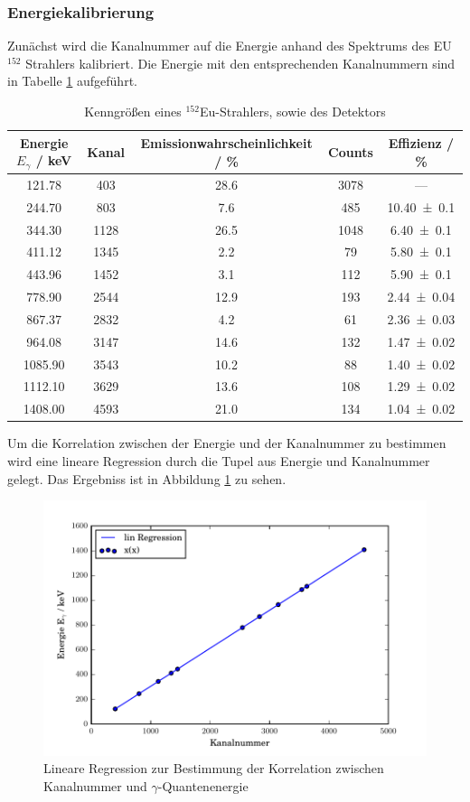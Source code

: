 \subsubsection{Energiekalibrierung}
Zunächst wird die Kanalnummer auf die Energie anhand des Spektrums des EU$^{152}$ Strahlers kalibriert. Die Energie mit den entsprechenden Kanalnummern sind in Tabelle \ref{tab:CsSpekt} aufgeführt.
\begin{table}
  \centering
  \caption{Kenngrößen eines $^{152}$Eu-Strahlers, sowie des Detektors}
  \begin{tabular}{c | c c c c}
    \toprule
    Energie $E_{\gamma}$ / keV& Kanal & Emissionwahrscheinlichkeit / \% & Counts & Effizienz / \% \\	
    \hline
    121.78	& 403	& 28.6	& 3078 	& ---	\\
    244.70	& 803	& 7.6	& 485 	& \num{10.40 +- 0.1}	\\
    344.30	& 1128	& 26.5	& 1048	& \num{6.40 +- 0.1}	\\
    411.12	& 1345	& 2.2	& 79	& \num{5.80 +- 0.1}	\\
    443.96	& 1452	& 3.1	& 112 	& \num{5.90 +- 0.1}	\\
    778.90	& 2544	& 12.9	& 193	& \num{2.44 +- 0.04}	\\
    867.37	& 2832	& 4.2	& 61	& \num{2.36 +- 0.03}	\\
    964.08	& 3147	& 14.6	& 132	& \num{1.47 +- 0.02}	\\
    1085.90	& 3543	& 10.2	& 88	& \num{1.40 +- 0.02}	\\
    1112.10	& 3629	& 13.6	& 108	& \num{1.29 +- 0.02}	\\
    1408.00	& 4593	& 21.0 	& 134	& \num{1.04 +- 0.02}	\\
    \bottomrule
  \end{tabular}
  \label{tab:CsSpekt}
\end{table} 
Um die Korrelation zwischen der Energie und der Kanalnummer zu bestimmen wird eine lineare Regression durch die Tupel aus Energie und Kanalnummer gelegt. Das Ergebniss ist in Abbildung \ref{fig:RegCs} zu sehen. 
\begin{figure}[htpb]
  \centering
  \includegraphics[width=\textwidth]{./build/CsReg.pdf}
  \caption{Lineare Regression zur Bestimmung der Korrelation zwischen Kanalnummer und $\gamma$-Quantenenergie}
  \label{fig:RegCs}
\end{figure}
